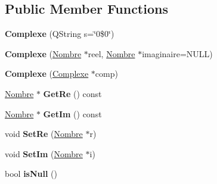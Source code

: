 \subsection*{Public Member Functions}
\begin{DoxyCompactItemize}
\item 
\hypertarget{class_calcul_1_1_complexe_a339a3e1127659228bb342a3e83433927}{{\bfseries Complexe} (Q\-String s=\char`\"{}0\$0\char`\"{})}\label{class_calcul_1_1_complexe_a339a3e1127659228bb342a3e83433927}

\item 
\hypertarget{class_calcul_1_1_complexe_ad47a4a48e44aa777f6e598f8221dea42}{{\bfseries Complexe} (\hyperlink{class_calcul_1_1_nombre}{Nombre} $\ast$reel, \hyperlink{class_calcul_1_1_nombre}{Nombre} $\ast$imaginaire=N\-U\-L\-L)}\label{class_calcul_1_1_complexe_ad47a4a48e44aa777f6e598f8221dea42}

\item 
\hypertarget{class_calcul_1_1_complexe_a042ce33da08cb71e717ac3b67e6c964b}{{\bfseries Complexe} (\hyperlink{class_calcul_1_1_complexe}{Complexe} $\ast$comp)}\label{class_calcul_1_1_complexe_a042ce33da08cb71e717ac3b67e6c964b}

\item 
\hypertarget{class_calcul_1_1_complexe_acb9136f710db8d1d83a5a25d76fb6dfe}{\hyperlink{class_calcul_1_1_nombre}{Nombre} $\ast$ {\bfseries Get\-Re} () const }\label{class_calcul_1_1_complexe_acb9136f710db8d1d83a5a25d76fb6dfe}

\item 
\hypertarget{class_calcul_1_1_complexe_a07757377f6a1de6afd6364edb00784b7}{\hyperlink{class_calcul_1_1_nombre}{Nombre} $\ast$ {\bfseries Get\-Im} () const }\label{class_calcul_1_1_complexe_a07757377f6a1de6afd6364edb00784b7}

\item 
\hypertarget{class_calcul_1_1_complexe_af544268718f1709a2ff534210051442c}{void {\bfseries Set\-Re} (\hyperlink{class_calcul_1_1_nombre}{Nombre} $\ast$r)}\label{class_calcul_1_1_complexe_af544268718f1709a2ff534210051442c}

\item 
\hypertarget{class_calcul_1_1_complexe_a14ba5f590705435810d24d29e59b1012}{void {\bfseries Set\-Im} (\hyperlink{class_calcul_1_1_nombre}{Nombre} $\ast$i)}\label{class_calcul_1_1_complexe_a14ba5f590705435810d24d29e59b1012}

\item 
\hypertarget{class_calcul_1_1_complexe_a2e153caf21e98a21ccbd02ed55896056}{bool {\bfseries is\-Null} ()}\label{class_calcul_1_1_complexe_a2e153caf21e98a21ccbd02ed55896056}


\end{DoxyCompactItemize}
